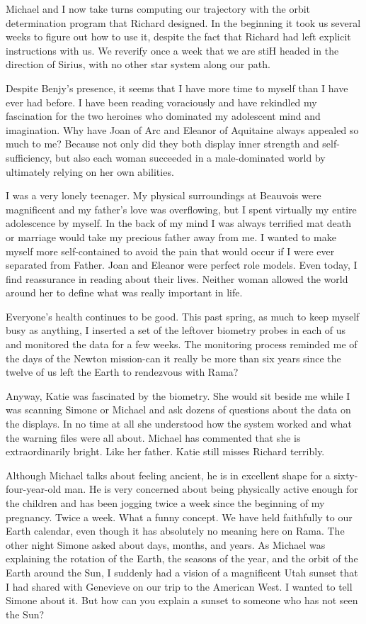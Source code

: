 \documentclass[]{article}
\begin{document}
Michael and I now take turns computing our trajectory with the orbit determination program that Richard designed.  In the beginning it took us several weeks to figure out how to use it, despite the fact that Richard had left explicit instructions with us.  We reverify once a week that we are stiH headed in the direction of Sirius, with no other star system along our path.

Despite Benjy’s presence, it seems that I have more time to myself than I have ever had before.  I have been reading voraciously and have rekindled my fascination for the two heroines who dominated my adolescent mind and imagination.  Why have Joan of Arc and Eleanor of Aquitaine always appealed so much to me? Because not only did they both display inner strength and self-sufficiency, but also each woman succeeded in a male-dominated world by ultimately relying on her own abilities.

I was a very lonely teenager.  My physical surroundings at Beauvois were magnificent and my father’s love was overflowing, but I spent virtually my entire adolescence by myself.  In the back of my mind I was always terrified mat death or marriage would take my precious father away from me.  I wanted to make myself more self-contained to avoid the pain that would occur if I were ever separated from Father.  Joan and Eleanor were perfect role models.  Even today, I find reassurance in reading about their lives.  Neither woman allowed the world around her to define what was really important in life.

Everyone’s health continues to be good.  This past spring, as much to keep myself busy as anything, I inserted a set of the leftover biometry probes in each of us and monitored the data for a few weeks.  The monitoring process reminded me of the days of the Newton mission-can it really be more than six years since the twelve of us left the Earth to rendezvous with Rama?

Anyway, Katie was fascinated by the biometry.  She would sit beside me while I was scanning Simone or Michael and ask dozens of questions about the data on the displays.  In no time at all she understood how the system worked and what the warning files were all about.  Michael has commented that she is extraordinarily bright.  Like her father.  Katie still misses Richard terribly.

Although Michael talks about feeling ancient, he is in excellent shape for a sixty-four-year-old man.  He is very concerned about being physically active enough for the children and has been jogging twice a week since the beginning of my pregnancy.  Twice a week.  What a funny concept.  We have held faithfully to our Earth calendar, even though it has absolutely no meaning here on Rama.  The other night Simone asked about days, months, and years.  As Michael was explaining the rotation of the Earth, the seasons of the year, and the orbit of the Earth around the Sun, I suddenly had a vision of a magnificent Utah sunset that I had shared with Genevieve on our trip to the American West.  I wanted to tell Simone about it.  But how can you explain a sunset to someone who has not seen the Sun?
\end{document}
